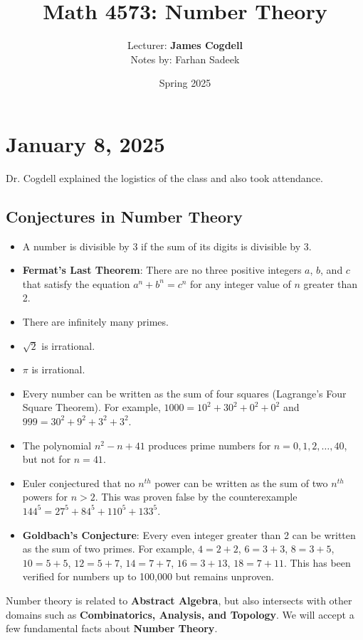 \documentclass[11pt]{article}
\title{Math 4573: Number Theory}
\author{Lecturer: \textbf{James Cogdell}\\Notes by: Farhan Sadeek}
\date{Spring 2025}
\begin{document}
\maketitle

\section{January 8, 2025}

Dr. Cogdell explained the logistics of the class and also took attendance.

\subsection{Conjectures in Number Theory}
\begin{itemize}
    \item A number is divisible by 3 if the sum of its digits is divisible by 3.
    \item \textbf{Fermat's Last Theorem}: There are no three positive integers $a$, $b$, and $c$ that satisfy the equation $a^n + b^n = c^n$ for any integer value of $n$ greater than 2.
    \item There are infinitely many primes.
    \item $\sqrt{2}$ is irrational.
    \item $\pi$ is irrational.
    \item Every number can be written as the sum of four squares (Lagrange's Four Square Theorem). For example, $1000 = 10^2 + 30^2 + 0^2 + 0^2$ and $999 = 30^2 + 9^2 + 3^2 + 3^2$.
    \item The polynomial $n^2 - n + 41$ produces prime numbers for $n = 0, 1, 2, \ldots, 40$, but not for $n = 41$.
    \item Euler conjectured that no $n^{th}$ power can be written as the sum of two $n^{th}$ powers for $n > 2$. This was proven false by the counterexample $144^5 = 27^5 + 84^5 + 110^5 + 133^5$.
    \item \textbf{Goldbach's Conjecture}: Every even integer greater than 2 can be written as the sum of two primes. For example, $4 = 2 + 2$, $6 = 3 + 3$, $8 = 3 + 5$, $10 = 5 + 5$, $12 = 5 + 7$, $14 = 7 + 7$, $16 = 3 + 13$, $18 = 7 + 11$. This has been verified for numbers up to 100,000 but remains unproven.
\end{itemize}

Number theory is related to \textbf{Abstract Algebra}, but also intersects with other domains such as \textbf{Combinatorics, Analysis, and Topology}. We will accept a few fundamental facts about \textbf{Number Theory}.
\end{document}
